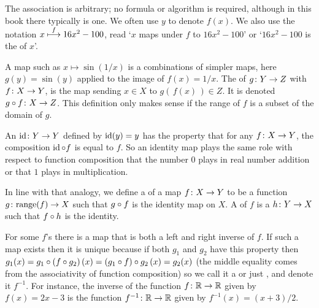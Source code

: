 The association is arbitrary; no formula or algorithm is required, although in
this book there typically is one.
We often use $y$ to denote $f(x)$. 
We also use the notation \( x\stackrel{f}{\longmapsto} 16x^2-100 \), read
`\( x \) maps under \( f \) to \( 16x^2-100 \)' or
`\( 16x^2-100 \) is the 
of \( x \)'.

A map such as \( x\mapsto \sin(1/x) \) is a
combinations of simpler maps, here
\( g(y)=\sin(y) \) applied to the image of \( f(x)=1/x \).
The  
of \( \mbox{$g\colon Y\to Z$} \) with \( \mbox{$f\colon X\to Y$} \),
is the map sending
\( x\in X \) to \( g(\, f(x)\,)\in Z \).
It is denoted \( \mbox{$g\mathbin{\circ} f\colon X\to Z$} \).
This definition only makes sense if the range of \( f \) is a
subset of the domain of \( g \).

An 
\( \mbox{$\operatorname{id}\colon Y\to Y$} \) defined by
\( \operatorname{id}(y)=y \) has the property that for any \( \mbox{$f\colon X\to Y$} \),
the composition \( \operatorname{id}\mathbin{\circ} f \) is equal to \( f \).
So an identity map plays the same role with respect to function composition
that the number \( 0 \) plays in real number addition or that 
\( 1 \) plays in multiplication.

In line with that analogy, we define a
 of a map 
\( \mbox{$f\colon X\to Y$} \) to be a
function \( \mbox{$g\colon \text{range}(f)\to X$} \) such that \( g\mathbin{\circ} f \)
is the identity map on \( X \).
A  
of \( f \) is a
\( \mbox{$h\colon Y\to X$} \) such that \( f\mathbin{\circ} h \) is the identity.

For some $f$'s there is a map that is 
both a left and right inverse of \( f \).
If such a map exists then it is unique because if both \( g_1 \) and
\( g_2 \) have this property then
\( g_1(x)=g_1\mathbin{\circ}  (f\mathbin{\circ} g_2)\,(x)
         =(g_1\mathbin{\circ} f) \mathbin{\circ} g_2\,(x)
         =g_2(x) \)
(the middle equality comes from the associativity of function composition)
so we call it a  or just  
,
and denote it \( f^{-1} \). 
For instance, the inverse of the function \( \mbox{$f\colon \mathbb{R}\to \mathbb{R}$} \)
given by \( f(x)=2x-3 \) is the function \( \mbox{$f^{-1}\colon \mathbb{R}\to \mathbb{R}$} \)
given by \( f^{-1}(x)=(x+3)/2 \).


